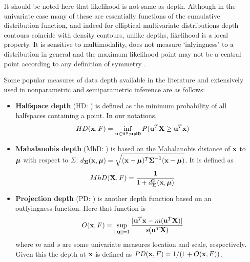 It should be noted here that likelihood is not same as depth. Although in the univariate case many of these are essentially functions of the cumulative distribution function, and indeed for elliptical multivariate distributions depth contours coincide with density contours, unlike depths, likelihood is a local property. It is sensitive to multimodality, does not measure `inlyingness' to a distribution in general and the maximum likelihood point may not be a central point according to any definition of symmetry \citep{serfling2006}.

%
%

Some popular measures of data depth available in the literature and extensively used in nonparametric and semiparametric inference are as follows:

\begin{itemize}
\item \textbf{Halfspace depth} (HD: \citep{tukey75}) is defined as the minimum probability of all halfspaces containing a point. In our notations,
%
$$ HD({\bf{x}}, F)  = \inf_{{\bf{u}} \in \mathbb{R}^p; {\bf{u}} \neq \bf0} P({\bf{u}}^T {\mathbf{X}} \geq {\bf{u}}^T {\bf{x}}) $$
%
\item \textbf{Mahalanobis depth} (MhD: \cite{LiuPareliusSingh99}) is based on the Mahalanobis distance of ${\bf{x}}$ to ${\boldsymbol{\mu}}$ with respect to $\Sigma$: $d_{\boldsymbol{\Sigma}}({\bf{x}}, {\boldsymbol{\mu}}) = \sqrt{({\bf{x}} - {\boldsymbol{\mu}})^T {\boldsymbol{\Sigma}}^{-1} ({\bf{x}} - {\boldsymbol{\mu}})}$. It is defined as
%
$$ MhD({\mathbf{X}}, F) = \frac{1}{1 + d^2_{\boldsymbol{\Sigma}} ({\bf{x}}, {\boldsymbol{\mu}})} $$
%

\item \textbf{Projection depth} (PD: \cite{zuo03}) is another depth function based on an outlyingness function. Here that function is
%
$$ O({\bf{x}}, F) = \sup_{\| {\bf{u}} \| = 1} \frac{| {\bf{u}}^T{\bf{x}} - m({\bf{u}}^T{\mathbf{X}})|}{s({\bf{u}}^T{\mathbf{X}})} $$
%
where $m$ and $s$ are some univariate measures location and scale, respectively. Given this the depth at ${\bf{x}}$ is defined as $PD({\bf{x}}, F) = 1/(1+O({\bf{x}}, F))$.
\end{itemize}

